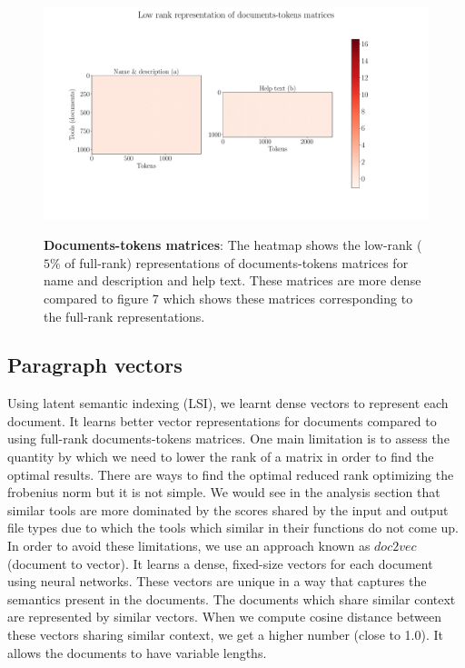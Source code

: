 \begin{figure}[h]
\begin{centering}
    {\includegraphics[scale=0.33]{figures/Document_tokens_low_rank.pdf}}
    \caption[Documents-tokens matrices]{\textbf{Documents-tokens matrices}: The heatmap shows the low-rank ($5\%$ of full-rank) representations of documents-tokens matrices for name and description and help text. These matrices are more dense compared to figure 7 which shows these matrices corresponding to the full-rank representations.}
\end{centering}
\end{figure}

\subsection{Paragraph vectors}
Using latent semantic indexing (LSI), we learnt dense vectors to represent each document. It learns better vector representations for documents compared to using full-rank documents-tokens matrices. One main limitation is to assess the quantity by which we need to lower the rank of a matrix in order to find the optimal results. There are ways to find the optimal reduced rank optimizing the frobenius norm but it is not simple. We would see in the analysis section that similar tools are more dominated by the scores shared by the input and output file types due to which the tools which similar in their functions do not come up. In order to avoid these limitations, we use an approach known as $doc2vec$ (document to vector). It learns a dense, fixed-size vectors for each document using neural networks. These vectors are unique in a way that captures the semantics present in the documents. The documents which share similar context are represented by similar vectors. When we compute cosine distance between these vectors sharing similar context, we get a higher number (close to 1.0). It allows the documents to have variable lengths.


